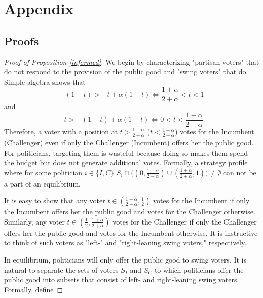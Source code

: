 \documentclass[12pt,english]{article}
\begin{document}



\appendix
\section*{Appendix}
\renewcommand{\thesubsection}{\Alph{subsection}}

\subsection{Proofs} \label{app-proofs}


\begin{proof}[Proof of Proposition \ref{informed}]
We begin by characterizing "partisan voters" that do not respond to the provision of the public good and "swing voters" that do. Simple algebra shows that
\begin{equation}
\label{partisans1}
-(1 - t) > -t + \alpha(1 - t) \Leftrightarrow \frac{1 + \alpha }{2 + \alpha}<t<1
\end{equation}
and 
\begin{equation}
\label{partisans2}
-t > -(1 - t) + \alpha(1 - t)   \Leftrightarrow 0<t<\frac{1 - \alpha }{2 - \alpha }.
\end{equation}
Therefore, a voter with a position at $t > \frac{1 + \alpha }{2 + \alpha }$ ($t<\frac{1 - \alpha}{2 - \alpha}$) votes for the Incumbent (Challenger) even if only the Challenger (Incumbent) offers her the public good. For politicians, targeting them is wasteful because doing so makes them spend the budget but does not generate additional votes. Formally, a strategy profile where for some politician $i \in \{I,C\}$ $S_i \cap  \big( (0, \frac{1 - \alpha }{2 - \alpha}) \cup (\frac{1 + \alpha }{2 + \alpha },1) \big)\neq \emptyset$  can not be a part of an equilibrium. 

It is easy to show that any voter $t \in (\frac{1 - \alpha}{2 - \alpha}, \frac{1}{2})$ votes for the Incumbent if only the Incumbent offers her the public good and votes for the Challenger otherwise. Similarly, any voter $t \in (\frac{1}{2},\frac{1 + \alpha}{2 + \alpha})$ votes for the Challenger if only the Challenger offers her the public good and votes for the Incumbent otherwise. It is instructive to think of such voters as "left-" and "right-leaning swing voters," respectively. 

In equilibrium, politicians will only offer the public good to swing voters. It is
natural to separate the sets of voters $S_I$ and $S_C$ to which politicians offer the public good into subsets that consist of left- and right-leaning swing voters. Formally, define


\end{proof}
\end{document}
